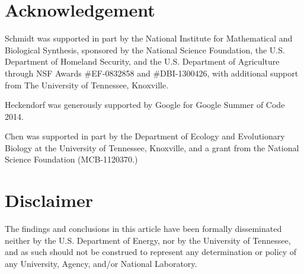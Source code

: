 \section*{Acknowledgement}

Schmidt was supported in part by the National 
Institute for Mathematical and Biological Synthesis, 
sponsored by the National Science Foundation, the 
U.S. Department of Homeland Security, and the U.S. 
Department of Agriculture through NSF Awards 
\#EF-0832858 and \#DBI-1300426, with additional 
support from The University of Tennessee, Knoxville. 

Heckendorf was generously supported by Google for Google 
Summer of Code 2014.

Chen was supported in part by
the Department of Ecology and Evolutionary Biology at the
University of Tennessee, Knoxville, and a grant from
the National Science Foundation (MCB-1120370.)

\section*{Disclaimer}
The findings and conclusions in this article have been formally disseminated
neither by the U.S. Department of Energy, nor by the University of Tennessee,
and as such should not be construed to represent any determination or policy of
any University, Agency, and/or National Laboratory.
